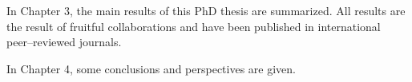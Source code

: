 In Chapter 3, the main results of this PhD thesis are summarized. All results are the result of fruitful collaborations and have been published in international peer--reviewed journals. 

In Chapter 4, some conclusions and perspectives are given.






%
